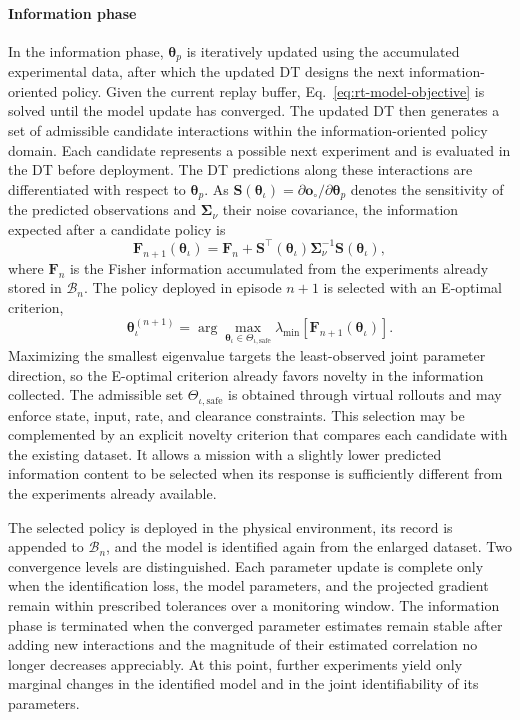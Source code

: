 \documentclass[journal]{IEEEtran}
\begin{document}
\paragraph*{Information phase}
In the information phase, $\boldsymbol{\theta}_{p}$ is iteratively updated using the accumulated experimental data, after which the updated DT designs the next information-oriented policy. Given the current replay buffer, Eq.~\eqref{eq:rt-model-objective} is solved until the model update has converged. The updated DT then generates a set of admissible candidate interactions within the information-oriented policy domain. Each candidate represents a possible next experiment and is evaluated in the DT before deployment. The DT predictions along these interactions are differentiated with respect to $\boldsymbol{\theta}_p$. As $\mathbf S(\boldsymbol{\theta}_{\iota})=\partial\mathbf o_{\circ}/\partial\boldsymbol{\theta}_p$ denotes the sensitivity of the predicted observations and $\boldsymbol{\Sigma}_{\nu}$ their noise covariance, the information expected after a candidate policy is
\begin{equation}
\mathbf F_{n+1}(\boldsymbol{\theta}_{\iota})
=
\mathbf F_n+
\mathbf S^{\top}(\boldsymbol{\theta}_{\iota})
\boldsymbol{\Sigma}_{\nu}^{-1}
\mathbf S(\boldsymbol{\theta}_{\iota}),
\label{eq:rt-fisher-update}
\end{equation}
where $\mathbf F_n$ is the Fisher information accumulated from the experiments already stored in $\mathcal B_n$. The policy deployed in episode $n+1$ is selected with an E-optimal criterion,
\begin{equation}
\boldsymbol{\theta}_{\iota}^{(n+1)}
=
\arg\max_{\boldsymbol{\theta}_{\iota}\in\Theta_{\iota,\mathrm{safe}}}
\lambda_{\min}\!\left[
\mathbf F_{n+1}(\boldsymbol{\theta}_{\iota})
\right].
\label{eq:rt-e-optimal}
\end{equation}
Maximizing the smallest eigenvalue targets the least-observed joint parameter direction, so the E-optimal criterion already favors novelty in the information collected. The admissible set $\Theta_{\iota,\mathrm{safe}}$ is obtained through virtual rollouts and may enforce state, input, rate, and clearance constraints. This selection may be complemented by an explicit novelty criterion that compares each candidate with the existing dataset. It allows a mission with a slightly lower predicted information content to be selected when its response is sufficiently different from the experiments already available.

The selected policy is deployed in the physical environment, its record is appended to $\mathcal B_n$, and the model is identified again from the enlarged dataset. Two convergence levels are distinguished. Each parameter update is complete only when the identification loss, the model parameters, and the projected gradient remain within prescribed tolerances over a monitoring window. The information phase is terminated when the converged parameter estimates remain stable after adding new interactions and the magnitude of their estimated correlation no longer decreases appreciably. At this point, further experiments yield only marginal changes in the identified model and in the joint identifiability of its parameters.
\end{document}
